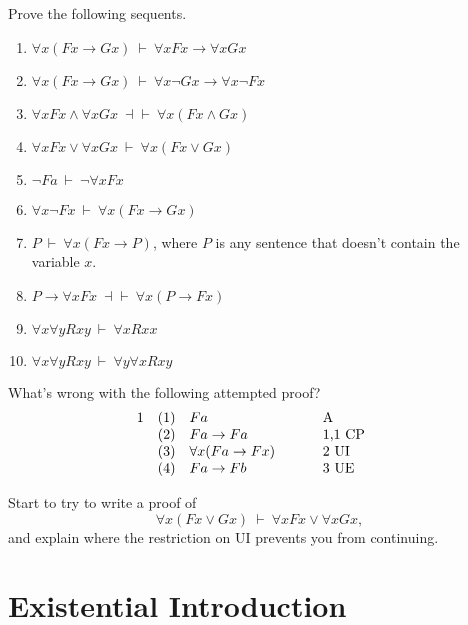 \begin{exercises} Prove the following sequents. \label{ex:ui}
  \begin{enumerate}
    \item $\forall x(Fx\to Gx)\:\vdash\: \forall xFx\to \forall xGx$
    \item $\forall x(Fx\to Gx)\:\vdash\:\forall x\neg Gx\to \forall
      x\neg Fx$
    \item $\forall xFx\wedge \forall xGx\:\dashv\vdash\: \forall x(Fx\wedge
      Gx)$
    \item $\forall xFx\vee \forall xGx\:\vdash\: \forall x(Fx\vee Gx)$
    \item $\neg Fa\:\vdash\:\neg\forall xFx$
    \item $\forall x\neg Fx\:\vdash\:\forall x(Fx\to Gx)$
    \item $P\:\vdash\: \forall x(Fx\to P)$, where $P$ is any sentence
      that doesn't contain the variable $x$.
    \item $P\to \forall xFx\:\dashv\vdash\: \forall x(P\to Fx)$  
    \item $\forall x\forall yRxy\:\vdash\: \forall xRxx$
    \item $\forall x\forall yRxy\:\vdash\: \forall y\forall xRxy$
    \end{enumerate}
  \end{exercises}

  \begin{exercise} What's wrong with the following attempted proof? 
\[ \begin{array}{l l >{$}p{3cm}<{$} p{1.5cm}}
     1 & (1) & Fa  & A \\
       & (2) & Fa\to Fa & 1,1 CP \\
       & (3) & \forall x(Fa\to Fx) & 2 UI  \\
       & (4) & Fa\to Fb & 3 UE \end{array} \] \end{exercise}

 \begin{exercise} Start to try to write a proof of \[ \forall x(Fx\vee
  Gx)\:\vdash\:\forall xFx\vee \forall xGx ,\] and explain where the
  restriction on UI prevents you from continuing. \end{exercise}  
  

\section*{Existential Introduction}

